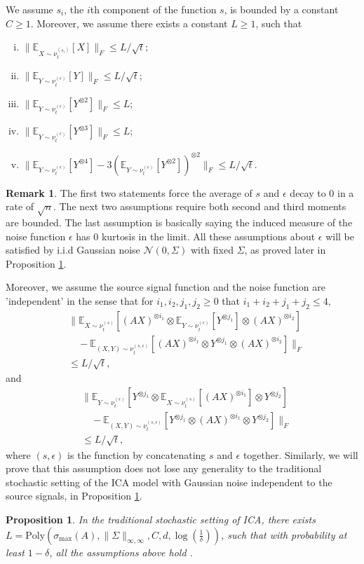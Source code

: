 \documentclass[twoside]{article}
\newcommand{\E}{\mathbb{E}}
\newtheorem{prop}[lemma]{Proposition}
\theoremstyle{definition}
\newtheorem{remark}[lemma]{Remark}
\begin{document}
We assume $s_i$, the $i$th component of the function $s$, is bounded by a constant $C\ge 1$.
Moreover, we assume there exists a constant $L\ge 1$, such that 
\begin{enumerate}[i.]
\vspace{-3mm}
\item $\| \E_{X\sim \nu_t^{(s_i)}} [X] \|_F\le L/\sqrt{t}$;
\item $\| \E_{Y\sim \nu_t^{(\epsilon)}} [Y] \|_F \le L/\sqrt{t}$;
\item $\| \E_{Y\sim \nu_t^{(\epsilon)}} [Y^{\otimes 2}] \|_F \le L$;
\item $\| \E_{Y\sim \nu_t^{(\epsilon)}} [Y^{\otimes 3}] \|_F \le L$;
\item $\| \E_{Y\sim \nu_t^{(\epsilon)}} [Y^{\otimes4}] - 3(\E_{Y\sim \nu_t^{(\epsilon)}} [Y^{\otimes2}])^{\otimes 2} \|_F\le L/\sqrt{t}$.
\end{enumerate}
\vspace{-2mm}
\begin{remark}
The first two statements force the average of $s$ and $\epsilon$ decay to 0 in a rate of $\sqrt{n}$.
The next two assumptions require both second and third moments are bounded.
The last assumption is basically saying the induced measure of the noise function $\epsilon$ has 0 kurtosis in the limit.
All these assumptions about $\epsilon$ will be satisfied by i.i.d Gaussian noise $\mathcal{N}(0,\Sigma)$ with fixed $\Sigma$, as proved later in Proposition \ref{prop:stochasticAss}.
\end{remark}
Moreover, we assume the source signal function and the noise function are 'independent' in the sense that for $i_1,i_2,j_1,j_2 \ge 0$ that $i_1+i_2+j_1+j_2 \le 4$,  
\begin{align*}
& \| \E_{X\sim \nu_t^{(s)}} [(AX)^{\otimes i_1}\otimes \E_{Y\sim \nu_t^{(\epsilon)}} [Y^{\otimes j_1}] \otimes (AX)^{\otimes i_2}]\\
& \quad - \E_{(X, Y)\sim \nu_t^{(s, \epsilon)}} [(AX)^{\otimes i_1}\otimes Y^{\otimes j_1}\otimes (AX)^{\otimes i_2}]  \|_F \\
& \le L/\sqrt{t},
\end{align*}
and 
\begin{align*}
& \| \E_{Y\sim \nu_t^{(\epsilon)}} [Y^{\otimes j_1} \otimes \E_{X\sim \nu_t^{(s)}} [(AX)^{\otimes i_1}] \otimes Y^{\otimes j_2}] \\
& \quad - \E_{(X, Y)\sim \nu_t^{(s, \epsilon)}} [ Y^{\otimes j_1}\otimes (AX)^{\otimes i_1}\otimes Y^{\otimes j_2}] \|_F \\
& \le L/\sqrt{t},
\end{align*}
 where $(s,\epsilon)$ is the function by concatenating $s$ and $\epsilon$ together.  
Similarly, we will prove that this assumption does not lose any generality to the traditional stochastic setting of the ICA model with Gaussian noise independent to the source signals, in Proposition \ref{prop:stochasticAss}. 
\begin{prop}
\label{prop:stochasticAss}
In the traditional stochastic setting of ICA, there exists $L = \text{Poly}(\sigma_{\max}(A), \|\Sigma\|_{\infty,\infty}, C, d, \log(\frac{1}{\delta}))$, such that with probability at least $1-\delta$, all the assumptions above hold .
\end{prop}
\end{document}
